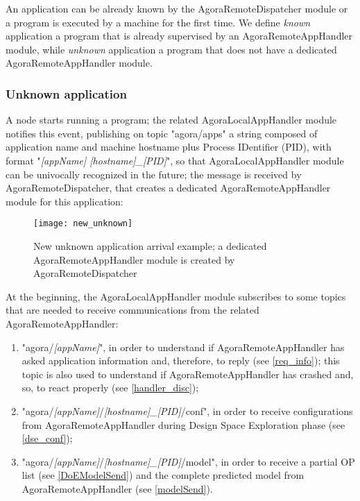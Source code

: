 An application can be already known by the Agora\-Remote\-Dis\-patch\-er module or a program is executed by a machine for the first time. We define \textit{known} application a program that is already supervised by an AgoraRemoteAppHandler module, while \textit{unknown} application a program that does not have a dedicated AgoraRemoteAppHandler module.

\subsubsection{Unknown application}

A node starts running a program; the related AgoraLocalAppHandler module notifies this event, publishing on topic "agora\slash{}apps" a string composed of application name and machine hostname plus Process IDentifier (PID), with format "\textit{[appName] [hostname]\_[PID]}", so that AgoraLocalAppHandler module can be univocally recognized in the future; the message is received by Agora\-Remote\-Dispatcher, that creates a dedicated AgoraRemoteAppHandler module for this application:

\begin{figure}[H]

    \centering
    \texttt{[image: new\_unknown]}
    \caption[New unknown application arrival example]{New unknown application arrival example; a dedicated AgoraRemoteAppHandler module is created by AgoraRemoteDispatcher}
    
\end{figure}

At the beginning, the AgoraLocalAppHandler module subscribes to some topics that are needed to receive communications from the related AgoraRemoteAppHandler:

\begin{enumerate}

    \item "agora/\textit{[appName]}", in order to understand if AgoraRemoteAppHandler has asked application information and, therefore, to reply (see \ref{req_info}); this topic is also used to understand if Agora\-Remote\-App\-Handler has crashed and, so, to react properly (see \ref{handler_disc});
    
    \item "agora/\textit{[appName]}/\textit{[hostname]\_[PID]}/conf", in order to receive configurations from AgoraRemoteAppHandler during Design Space Exploration phase (see \ref{dse_conf});
    
    \item "agora/\textit{[appName]}/\textit{[hostname]\_[PID]}/model", in order to receive a partial OP list (see \ref{DoEModelSend}) and the complete predicted model from AgoraRemoteAppHandler (see \ref{modelSend}).

\end{enumerate}

